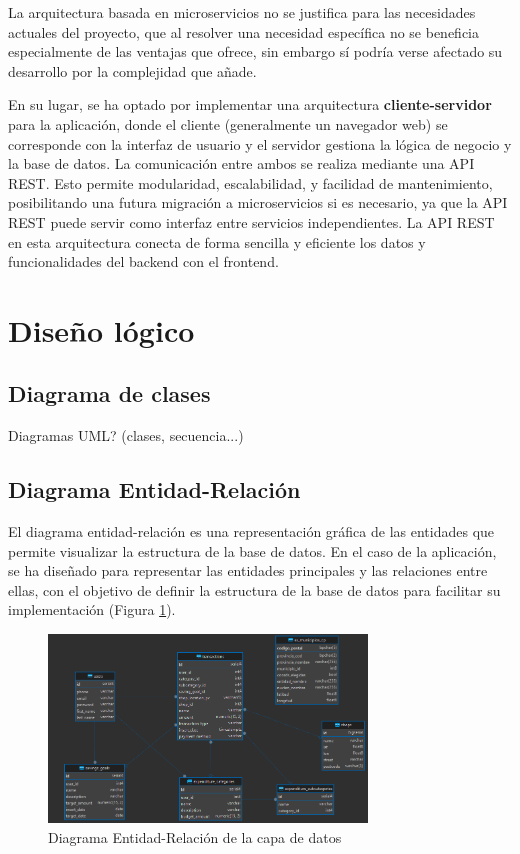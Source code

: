 La arquitectura basada en microservicios no se justifica para las necesidades actuales del proyecto, que al resolver una necesidad específica no se beneficia especialmente de las ventajas que ofrece, sin embargo sí podría verse afectado su desarrollo por la complejidad que añade. 

En su lugar, se ha optado por implementar una arquitectura \textbf{cliente-servidor} para la aplicación, donde el cliente (generalmente un navegador web) se corresponde con la interfaz de usuario y el servidor gestiona la lógica de negocio y la base de datos. La comunicación entre ambos se realiza mediante una API REST. Esto permite modularidad, escalabilidad, y facilidad de mantenimiento, posibilitando una futura migración a microservicios si es necesario, ya que la API REST puede servir como interfaz entre servicios independientes. La API REST en esta arquitectura conecta de forma sencilla y eficiente los datos y funcionalidades del backend con el frontend.

\section{Diseño lógico}


\subsection{Diagrama de clases}
Diagramas UML? (clases, secuencia...)

\subsection{Diagrama Entidad-Relación}
El diagrama entidad-relación es una representación gráfica de las entidades que permite visualizar la estructura de la base de datos. En el caso de la aplicación, se ha diseñado para representar las entidades principales y las relaciones entre ellas, con el objetivo de definir la estructura de la base de datos para facilitar su implementación (Figura \ref{fig:diagrama_ER}).

\begin{figure}[ht!]
    \centering
    \includegraphics[height=50mm]{imagenes/diagrama_ER.png}
    \caption{Diagrama Entidad-Relación de la capa de datos}
    \label{fig:diagrama_ER}
\end{figure}


